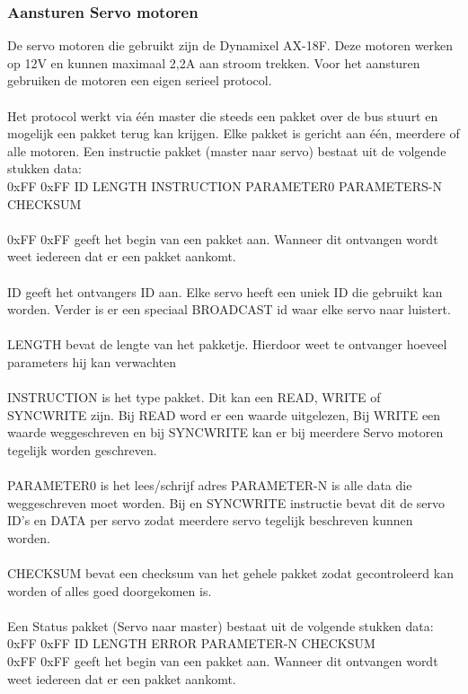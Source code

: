 \documentclass[10pt,a4paper]{article}
\begin{document}
\subsubsection{Aansturen Servo motoren}
De servo motoren die gebruikt zijn de Dynamixel AX-18F. Deze motoren werken op 12V en kunnen maximaal 2,2A aan stroom trekken.
Voor het aansturen gebruiken de motoren een eigen serieel protocol.\\\\
Het protocol werkt via \'e\'en master die steeds een pakket over de bus stuurt en mogelijk een pakket terug kan krijgen. Elke pakket is gericht aan \'e\'en, meerdere of alle motoren.
Een instructie pakket (master naar servo) bestaat uit de volgende stukken data:\\
0xFF 0xFF ID LENGTH INSTRUCTION PARAMETER0 PARAMETERS-N CHECKSUM\\\\
0xFF 0xFF geeft het begin van een pakket aan. Wanneer dit ontvangen wordt weet iedereen dat er een pakket aankomt.\\\\
ID geeft het ontvangers ID aan. Elke servo heeft een uniek ID die gebruikt kan worden. Verder is er een speciaal BROADCAST id waar elke servo naar luistert.\\\\
LENGTH bevat de lengte van het pakketje. Hierdoor weet te ontvanger hoeveel parameters hij kan verwachten\\\\
INSTRUCTION is het type pakket. Dit kan een READ, WRITE of SYNCWRITE zijn. Bij READ word er een waarde uitgelezen, Bij WRITE een waarde weggeschreven en bij SYNCWRITE kan er bij meerdere Servo motoren tegelijk worden geschreven.\\\\
PARAMETER0 is het lees/schrijf adres
PARAMETER-N is alle data die weggeschreven moet worden. Bij en SYNCWRITE instructie bevat dit de servo ID's en DATA per servo zodat meerdere servo tegelijk beschreven kunnen worden.\\\\
CHECKSUM bevat een checksum van het gehele pakket zodat gecontroleerd kan worden of alles goed doorgekomen is.\\\\
Een Status pakket (Servo naar master) bestaat uit de volgende stukken data:\\
0xFF 0xFF ID LENGTH ERROR PARAMETER-N CHECKSUM\\
0xFF 0xFF geeft het begin van een pakket aan. Wanneer dit ontvangen wordt weet iedereen dat er een pakket aankomt.\\\\
\end{document}
